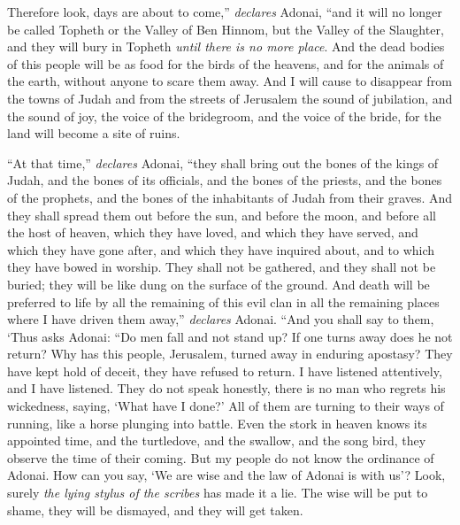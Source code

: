 \begin{biblechapter}
\verse Therefore look, days are about to come,” \textit{declares} Adonai, “and it will no longer be called Topheth or the Valley of Ben Hinnom, but the Valley of the Slaughter, and they will bury in Topheth \textit{until there is no more place}.
\verse And the dead bodies of this people will be as food for the birds of the heavens, and for the animals of the earth, without anyone to scare them away.
\verse And I will cause to disappear from the towns of Judah and from the streets of Jerusalem the sound of jubilation, and the sound of joy, the voice of the bridegroom, and the voice of the bride, for the land will become a site of ruins.
\end{biblechapter}

\begin{biblechapter} %
\verse “At that time,” \textit{declares} Adonai, “they shall bring out the bones of the kings of Judah, and the bones of its officials, and the bones of the priests, and the bones of the prophets, and the bones of the inhabitants of Judah from their graves.
\verse And they shall spread them out before the sun, and before the moon, and before all the host of heaven, which they have loved, and which they have served, and which they have gone after, and which they have inquired about, and to which they have bowed in worship. They shall not be gathered, and they shall not be buried; they will be like dung on the surface of the ground.
\verse And death will be preferred to life by all the remaining of this evil clan in all the remaining places where I have driven them away,” \textit{declares} Adonai.
 “And you shall say to them, ‘Thus asks Adonai:
\verse “Do men fall and not stand up? 
If one turns away does he not return?
\verse Why has this people, Jerusalem, turned away in enduring apostasy? 
They have kept hold of deceit, they have refused to return.
\verse I have listened attentively, 
and I have listened. 
They do not speak honestly, 
there is no man who regrets his wickedness, saying, ‘What have I done?’ 
All of them are turning to their ways of running, 
like a horse plunging into battle.
\verse Even the stork in heaven knows its appointed time, 
and the turtledove, and the swallow, and the song bird, 
they observe the time of their coming. 
But my people do not know the ordinance of Adonai.
\verse How can you say, ‘We are wise and the law of Adonai is with us’? 
Look, surely \textit{the lying stylus of the scribes} has made it a lie.
\verse The wise will be put to shame, 
they will be dismayed, 
and they will get taken. 

\end{biblechapter}
